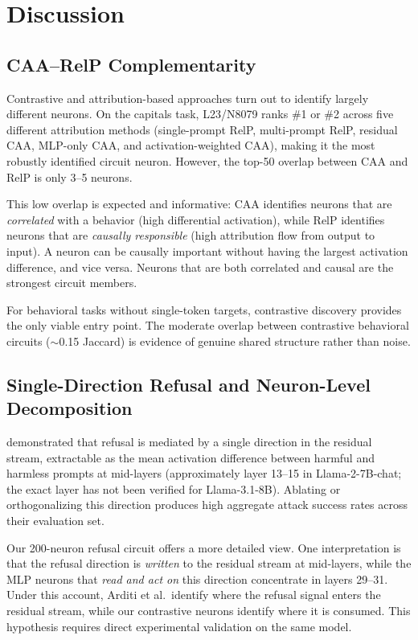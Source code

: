 \documentclass[11pt]{article}
\begin{document}
\section{Discussion}
\label{sec:discussion}

\subsection{CAA--RelP Complementarity}

Contrastive and attribution-based approaches turn out to identify largely different neurons.
On the capitals task, L23/N8079 ranks \#1 or \#2 across five different attribution methods (single-prompt RelP, multi-prompt RelP, residual CAA, MLP-only CAA, and activation-weighted CAA), making it the most robustly identified circuit neuron.
However, the top-50 overlap between CAA and RelP is only 3--5 neurons.

This low overlap is expected and informative: CAA identifies neurons that are \emph{correlated} with a behavior (high differential activation), while RelP identifies neurons that are \emph{causally responsible} (high attribution flow from output to input).
A neuron can be causally important without having the largest activation difference, and vice versa.
Neurons that are both correlated and causal are the strongest circuit members.

For behavioral tasks without single-token targets, contrastive discovery provides the only viable entry point.
The moderate overlap between contrastive behavioral circuits (${\sim}$0.15 Jaccard) is evidence of genuine shared structure rather than noise.

\subsection{Single-Direction Refusal and Neuron-Level Decomposition}

\citet{arditi2024refusal} demonstrated that refusal is mediated by a single direction in the residual stream, extractable as the mean activation difference between harmful and harmless prompts at mid-layers (approximately layer 13--15 in Llama-2-7B-chat; the exact layer has not been verified for Llama-3.1-8B).
Ablating or orthogonalizing this direction produces high aggregate attack success rates across their evaluation set.

Our 200-neuron refusal circuit offers a more detailed view.
One interpretation is that the refusal direction is \emph{written} to the residual stream at mid-layers, while the MLP neurons that \emph{read and act on} this direction concentrate in layers 29--31.
Under this account, Arditi et al.\ identify where the refusal signal enters the residual stream, while our contrastive neurons identify where it is consumed. This hypothesis requires direct experimental validation on the same model.
\end{document}
